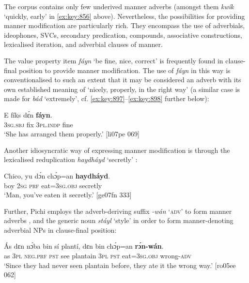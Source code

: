 The corpus contains only few underived manner adverbs (amongst them \textit{kwík} ‘quickly, early’ in \ref{ex:key:856} above). Nevertheless, the possibilities for providing manner modification are particularly rich. They encompass the use of adverbials, ideophones, SVCs, secondary predication, compounds, associative constructions, lexicalised iteration, and adverbial clauses of manner. 


The value property item \textit{fáyn} ‘be fine, nice, correct’ is frequently found in clause-final position to provide manner modification. The use of \textit{fáyn} in this way is conventionalised to such an extent that it may be considered an adverb with its own established meaning of ‘nicely, properly, in the right way’ (a similar case is made for \textit{bád} ‘extremely’, cf. \ref{ex:key:897}–\ref{ex:key:898} further below):



\ea%
    \label{ex:key:877}
    \gll E    fíks  dɛ́n    \textbf{fáyn}.\\
\textsc{3sg.sbj}  fix  \textsc{3pl.indp}  fine\\

\glt ‘She has arranged them properly.’ [li07pe 069]
\z

Another idiosyncratic way of expressing manner modification is through the lexicalised reduplication \textit{haydháyd} ‘secretly’ :


\ea%
    \label{ex:key:878}
    \gll Chico,  yu  dɔ́n  chɔ́p=an    \textbf{haydháyd}.\\
boy    \textsc{2sg}  \textsc{prf}  eat=\textsc{3sg.obj}  secretly\\

\glt ‘Man, you’ve eaten it secretly.’ [ge07fn 333]
\z

Further, Pichi employs the adverb-deriving suffix \textit{{}-wán} \textsc{‘adv’} to form manner adverbs , and the generic noun \textit{stáyl} ‘style’  in order to form manner-denoting adverbial NPs in clause-final position:


\ea%
    \label{ex:key:879}
    \gll \'{A}s  dɛn  nɔ́ba  bin  sí  plantí,  dɛn  bin  chɔ́p=an    \textbf{rɔ́n-wán}.\\
as  \textsc{3pl}  \textsc{neg.prf}  \textsc{pst}  see  plantain  \textsc{3pl}  \textsc{pst}  eat=\textsc{3sg.obj}  wrong-\textsc{adv}\\

\glt ‘Since they had never seen plantain before, they ate it the wrong way.’ [ro05ee 062]
\z



